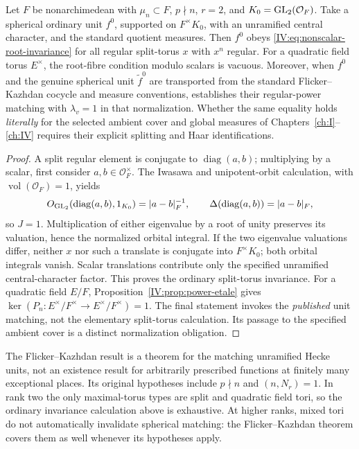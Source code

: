 \begin{proposition}
\label{IV:prop:ranktwo-unit}
Let $F$ be nonarchimedean with $\mu_n\subset F$, $p\nmid n$,
$r=2$, and $K_0=\operatorname{GL}_2(\mathcal O_F)$.  Take a spherical ordinary
unit $f^0$, supported on $F^\times K_0$, with an unramified
central character, and the standard quotient measures. Then
$f^0$ obeys \eqref{IV:eq:nonscalar-root-invariance} for all regular
split-torus $x$ with $x^n$ regular.  For a quadratic field torus
$E^\times$, the root-fibre condition modulo scalars is vacuous.
Moreover, when $f^0$ and the genuine spherical unit
$\widetilde f^0$ are transported from the standard
Flicker--Kazhdan cocycle and measure conventions,
\cite[\S12, Corollary]{FK86} establishes their regular-power
matching with $\lambda_v=1$ in that normalization.  Whether the
same equality holds \emph{literally} for the selected ambient
cover and global measures of Chapters~\ref{ch:I}--\ref{ch:IV} requires their explicit
splitting and Haar identifications.
\end{proposition}
\begin{proof}
A split regular element is conjugate to
$\operatorname{diag}(a,b)$; multiplying by a scalar, first
consider $a,b\in\mathcal O_F^\times$.  The Iwasawa and
unipotent-orbit calculation, with $\operatorname{vol}(\mathcal
O_F)=1$, yields
\[
 O_{\operatorname{GL}_2}\!\left(\operatorname{diag}(a,b),1_{K_0}\right)
       =|a-b|_F^{-1},\qquad
 \Delta\!\left(\operatorname{diag}(a,b)\right)=|a-b|_F,
\]
so $J=1$.  Multiplication of either eigenvalue by a root of unity
preserves its valuation, hence the normalized orbital integral.
If the two eigenvalue valuations differ, neither $x$ nor such a
translate is conjugate into $F^\times K_0$; both orbital
integrals vanish. Scalar translations contribute only the
specified unramified central-character factor.  This proves the
ordinary split-torus invariance. For a quadratic field $E/F$,
Proposition~\ref{IV:prop:power-etale} gives
$\ker(P_n:E^\times/F^\times\to E^\times/F^\times)=1$.
The final statement invokes the \emph{published} unit matching,
not the elementary split-torus calculation.  Its passage to the
specified ambient cover is a distinct normalization obligation.
\end{proof}

\begin{remark}
\label{IV:rem:fk-range}
The Flicker--Kazhdan result is a theorem for the matching
unramified Hecke units, not an existence result for arbitrarily
prescribed functions at finitely many exceptional places.
Its original hypotheses include $p\nmid n$ and
$(n,N_r)=1$. In rank two the only maximal-torus types are
split and quadratic field tori, so the ordinary invariance
calculation above is exhaustive.  At higher ranks, mixed tori
do not automatically invalidate spherical matching: the
Flicker--Kazhdan theorem covers them as well whenever its
hypotheses apply.
\end{remark}

